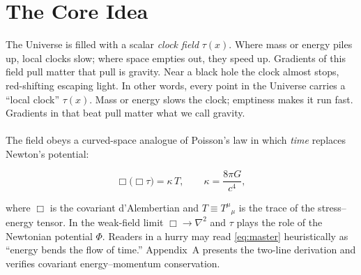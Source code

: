 \chapter{The Core Idea}
\label{chap:core-idea}

The Universe is filled with a scalar \emph{clock field} $\tau(x)$.  
Where mass or energy piles up, local clocks slow; where space empties out, they speed up. Gradients of this field pull matter that pull is gravity. Near a black hole the clock almost stops, red-shifting escaping light. In other words, every point in the Universe carries a “local clock” $\tau(x)$.  
Mass or energy slows the clock; emptiness makes it run fast. Gradients in that beat pull matter what we call gravity.\\
\\
The field obeys a curved-space analogue of Poisson’s law in which \emph{time} replaces Newton’s potential:

\begin{equation}
\Box\!\bigl(\Box \tau\bigr)=\kappa\,T,
\qquad
\kappa=\frac{8\pi G}{c^{4}},
\label{eq:master}
\end{equation}

\noindent
where $\Box$ is the covariant d’Alembertian and $T \equiv T^{\mu}{}_{\mu}$ is the trace of the stress–energy tensor.  
In the weak-field limit $\Box \to \nabla^{2}$ and $\tau$ plays the role of the Newtonian potential $\Phi$.  
Readers in a hurry may read \eqref{eq:master} heuristically as “energy bends the flow of time.”  
Appendix~A presents the two-line derivation and verifies covariant energy–momentum conservation.
